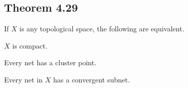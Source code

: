 \documentclass[../../main.tex]{subfiles}
\begin{document}
\subsection{Theorem 4.29}
\begin{wts}
If $X$ is any topological space, the following are equivalent.

\begin{enumalpha}
    \item $X$ is compact.
    \item Every net has a cluster point.
    \item Every net in $X$ has a convergent subnet.
\end{enumalpha}
\end{wts}
\newcommand{\xa}{\abrackets{x_\alpha}} %
\newcommand{\n}[1]{\mathcal{N}({#1})} %
\end{document}
